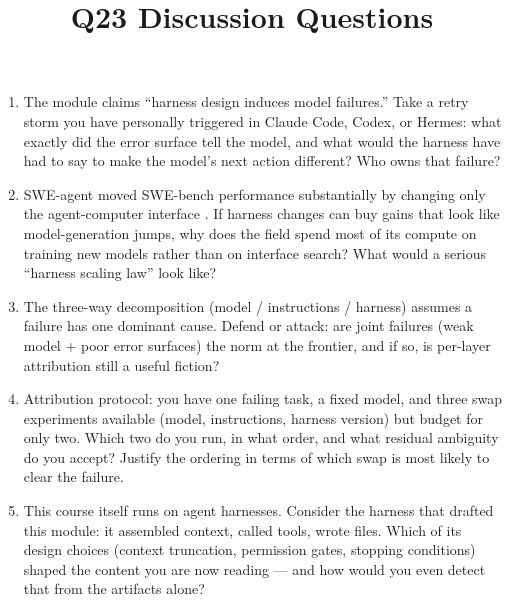 \documentclass[11pt]{article}
\title{Q23 Discussion Questions}
\date{}
\begin{document}
\maketitle
\begin{enumerate}[noitemsep]
\item The module claims ``harness design induces model failures.'' Take a retry storm you have personally triggered in Claude Code, Codex, or Hermes: what exactly did the error surface tell the model, and what would the harness have had to say to make the model's next action different? Who owns that failure?
\item SWE-agent moved SWE-bench performance substantially by changing only the agent-computer interface \cite{yang2024sweagent}. If harness changes can buy gains that look like model-generation jumps, why does the field spend most of its compute on training new models rather than on interface search? What would a serious ``harness scaling law'' look like?
\item The three-way decomposition (model / instructions / harness) assumes a failure has one dominant cause. Defend or attack: are joint failures (weak model + poor error surfaces) the norm at the frontier, and if so, is per-layer attribution still a useful fiction?
\item Attribution protocol: you have one failing task, a fixed model, and three swap experiments available (model, instructions, harness version) but budget for only two. Which two do you run, in what order, and what residual ambiguity do you accept? Justify the ordering in terms of which swap is most likely to clear the failure.
\item This course itself runs on agent harnesses. Consider the harness that drafted this module: it assembled context, called tools, wrote files. Which of its design choices (context truncation, permission gates, stopping conditions) shaped the content you are now reading --- and how would you even detect that from the artifacts alone?
\end{enumerate}
\end{document}
